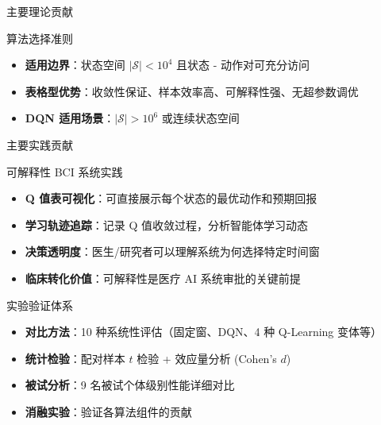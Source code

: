 {\begin{frame}{主要理论贡献}
    \vspace{0.3cm}
    \begin{block}{算法选择准则}
        \begin{itemize}
            \item \textbf{适用边界}：状态空间 $|\mathcal{S}| < 10^4$ 且状态 - 动作对可充分访问
            \item \textbf{表格型优势}：收敛性保证、样本效率高、可解释性强、无超参数调优
            \item \textbf{DQN 适用场景}：$|\mathcal{S}| > 10^6$ 或连续状态空间
        \end{itemize}
    \end{block}
\end{frame}

\begin{frame}{主要实践贡献}
    \begin{block}{可解释性 BCI 系统实践}
        \begin{itemize}
            \item \textbf{Q 值表可视化}：可直接展示每个状态的最优动作和预期回报
            \item \textbf{学习轨迹追踪}：记录 Q 值收敛过程，分析智能体学习动态
            \item \textbf{决策透明度}：医生/研究者可以理解系统为何选择特定时间窗
            \item \textbf{临床转化价值}：可解释性是医疗 AI 系统审批的关键前提
        \end{itemize}
    \end{block}

    \vspace{0.3cm}
    \begin{block}{实验验证体系}
        \begin{itemize}
            \item \textbf{对比方法}：10 种系统性评估（固定窗、DQN、4 种 Q-Learning 变体等）
            \item \textbf{统计检验}：配对样本 $t$ 检验 + 效应量分析 (Cohen's $d$)
            \item \textbf{被试分析}：9 名被试个体级别性能详细对比
            \item \textbf{消融实验}：验证各算法组件的贡献
        \end{itemize}
    \end{block}
\end{frame}

}
